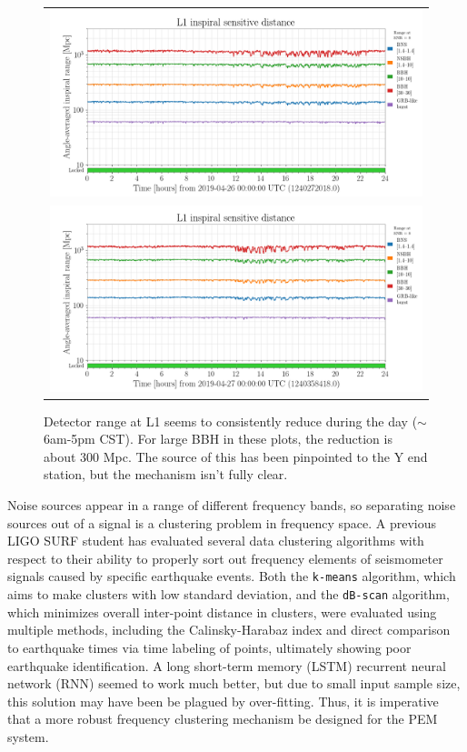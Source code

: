 \documentclass[colorlinks=true,pdfstartview=FitV,linkcolor=blue,
            citecolor=red,urlcolor=magenta]{ligodoc}
\begin{document}
\begin{figure}
  \begin{minipage}[c]{0.67\textwidth}
  \begin{tabular}{c}
  \includegraphics[width=\textwidth]{L1-LOCKED_216737_RANGE-1240272018-86400.png}   \\  \includegraphics[width=\textwidth]{L1-LOCKED_216737_RANGE-1240358418-86400.png}
  \end{tabular}
  \end{minipage}\hfill
  \begin{minipage}[t]{0.3\textwidth}
    \caption{Detector range at L1 seems to consistently reduce during the day ($\sim$6am-5pm CST). For large BBH in these plots, the reduction is about 300 Mpc. The source of this has been pinpointed to the Y end station, but the mechanism isn't fully clear.}
  \end{minipage}
\end{figure}

Noise sources appear in a range of different frequency bands, so separating noise sources out of a signal is a clustering problem in frequency space.
A previous LIGO SURF student has evaluated several data clustering algorithms with respect to their ability to properly sort out frequency elements of seismometer signals caused by specific earthquake events\cite{roxana}.
Both the \texttt{k-means} algorithm, which aims to make clusters with low standard deviation, and the \texttt{dB-scan} algorithm, which minimizes overall inter-point distance in clusters, were evaluated using multiple methods, including the Calinsky-Harabaz  index and direct comparison to earthquake times via time labeling of points, ultimately showing poor earthquake identification.
A long short-term memory (LSTM) recurrent neural network (RNN) seemed to work much better, but due to small input sample size, this solution may have been be plagued by over-fitting.
Thus, it is imperative that a more robust frequency clustering mechanism be designed for the PEM system.
\end{document}
